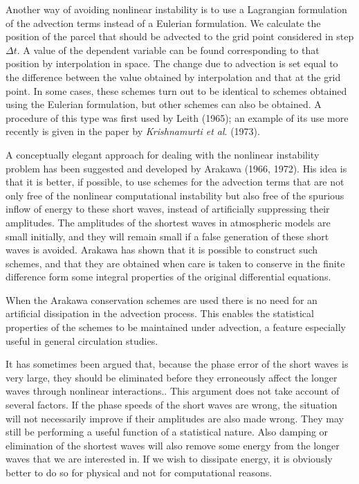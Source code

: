 Another way of avoiding nonlinear instability is to use a Lagrangian
formulation of the advection terms instead of a Eulerian formulation. We
calculate the position of the parcel that should be advected to the grid
point considered in step \(\Delta t\). A value of the dependent variable
can be found corresponding to that position by interpolation in space.
The change due to advection is set equal to the difference between the
value obtained by interpolation and that at the grid point. In some
cases, these schemes turn out to be identical to schemes obtained using
the Eulerian formulation, but other schemes can also be obtained. A
procedure of this type was first used by Leith (1965); an example of its
use more recently is given in the paper by \emph{Krishnamurti et al}.
(1973).

A conceptually elegant approach for dealing with the nonlinear
instability problem has been suggested and developed by Arakawa (1966,
1972). His idea is that it is better, if possible, to use schemes for
the advection terms that are not only free of the nonlinear
computational instability but also free of the spurious inflow of
energy to these short waves, instead of artificially suppressing their
amplitudes. The amplitudes of the shortest waves in atmospheric models
are small initially, and they will remain small if a false generation of
these short waves is avoided. Arakawa has shown that it is possible to
construct such schemes, and that they are obtained when care is taken to
conserve in the finite difference form some integral properties of the
original differential equations.

When the Arakawa conservation schemes are used there is no need for an
artificial dissipation in the advection process. This enables the
statistical properties of the schemes to be maintained under advection,
a feature especially useful in general circulation studies.

It has sometimes been argued that, because the phase error of the short
waves is very large, they should be eliminated before they erroneously
affect the longer waves through nonlinear interactions.. This argument
does not take account of several factors. If the phase speeds of the
short waves are wrong, the situation will not necessarily improve if
their amplitudes are also made wrong. They may still be performing a
useful function of a statistical nature. Also damping or elimination of
the shortest waves will also remove some energy from the longer waves
that we are interested in. If we wish to dissipate energy, it is
obviously better to do so for physical and not for computational
reasons.

